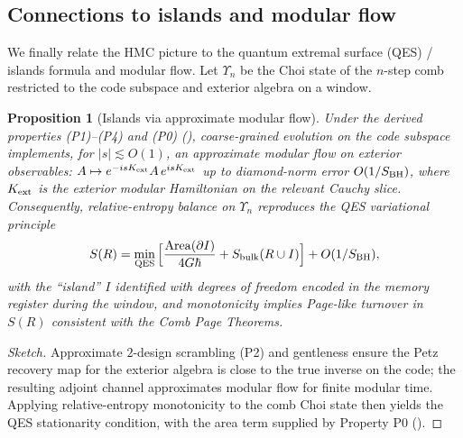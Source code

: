 \documentclass[a4paper,11pt]{article}
\newcommand{\HMC}{\textsc{HMC}\xspace}
\theoremstyle{plain}
\newtheorem{proposition}{Proposition}
\theoremstyle{definition}
\theoremstyle{remark}
\begin{document}
\subsection{Connections to islands and modular flow}
\label{sec:islands-modular}
We finally relate the \HMC{} picture to the quantum extremal surface (QES) / islands formula and modular flow.
Let $\Upsilon_{n}$ be the Choi state of the $n$-step comb restricted to the code subspace and exterior algebra on a window.
\begin{proposition}[Islands via approximate modular flow]\label{prop:islands-modular}
Under the derived properties (P1)--(P4) and (P0) (), coarse-grained evolution on the code subspace implements, for $|s|\lesssim O(1)$,
an \emph{approximate modular flow} on exterior observables: $A\mapsto e^{-isK_{\rm ext}}A\,e^{isK_{\rm ext}}$ up to
diamond-norm error $O(1/S_{\rm BH})$, where $K_{\rm ext}$ is the exterior modular Hamiltonian on the relevant Cauchy slice.
Consequently, relative-entropy balance on $\Upsilon_{n}$ reproduces the QES variational principle
\begin{equation}
S(R)=\min_{\rm QES}\Big[\frac{{\rm Area}(\partial I)}{4G\hbar}+S_{\rm bulk}(R\cup I)\Big] + O(1/S_{\rm BH}),
\end{equation}
with the ``island'' $I$ identified with degrees of freedom encoded in the memory register during the window, and
monotonicity implies Page-like turnover in $S(R)$ consistent with the Comb Page Theorems.
\end{proposition}
\begin{proof}[Sketch]
Approximate $2$-design scrambling (P2) and gentleness ensure the Petz recovery map for the exterior algebra is close to the true
inverse on the code; the resulting adjoint channel approximates modular flow for finite modular time. Applying relative-entropy
monotonicity to the comb Choi state then yields the QES stationarity condition, with the area term supplied by Property P0 ().
\end{proof}
\end{document}
